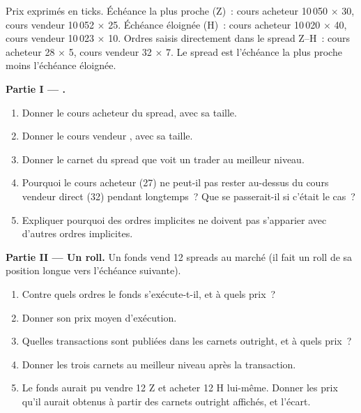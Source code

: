 \begin{problem}\label{pb:m1:matching-algorithms-and-implied-spreads:1}
Prix exprimés en ticks. Échéance la plus proche (Z)~: cours acheteur 10\,050 $\times$ 30, cours vendeur 10\,052
$\times$ 25. Échéance éloignée (H)~: cours acheteur 10\,020 $\times$ 40, cours vendeur 10\,023 $\times$ 10.
Ordres saisis directement dans le spread Z--H~: cours acheteur 28 $\times$ 5, cours vendeur 32 $\times$
7. Le spread est l'échéance la plus proche moins l'échéance éloignée.

\medskip\noindent\textbf{Partie I --- .}
\begin{enumerate}
\item Donner le cours acheteur  du spread, avec sa taille.
\item Donner le cours vendeur , avec sa taille.
\item Donner le carnet du spread que voit un trader au meilleur niveau.
\item Pourquoi le cours acheteur  (27) ne peut-il pas rester au-dessus du cours
vendeur direct (32) pendant longtemps~? Que se passerait-il si c'était le cas~?
\item Expliquer pourquoi des ordres implicites ne doivent pas s'apparier avec d'autres ordres implicites.
\end{enumerate}

\medskip\noindent\textbf{Partie II --- Un roll.}
Un fonds vend 12 spreads au marché (il fait un roll de sa position longue vers l'échéance suivante).
\begin{enumerate}[resume]
\item Contre quels ordres le fonds s'exécute-t-il, et à quels prix~?
\item Donner son prix moyen d'exécution.
\item Quelles transactions sont publiées dans les carnets outright, et à quels prix~?
\item Donner les trois carnets au meilleur niveau après la transaction.
\item Le fonds aurait pu vendre 12 Z et acheter 12 H lui-même. Donner les prix qu'il
aurait obtenus à partir des carnets outright affichés, et l'écart.
\end{enumerate}


\end{problem}
